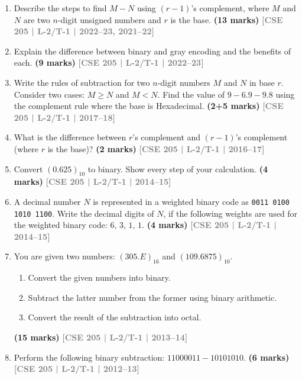 \documentclass[12pt]{article}
\newcommand{\yr}[1]{\hfill\textcolor{gray}{\small\textbf{[#1]}}}
\newcommand{\mk}[1]{\textcolor{orange!70!black}{\small\textbf{(#1 marks)}}}
\begin{document}
\begin{enumerate}

\item Describe the steps to find $M - N$ using $(r-1)$'s complement, where $M$ and $N$ are two $n$-digit unsigned numbers and $r$ is the base.
\mk{13} \yr{CSE 205 | L-2/T-1 | 2022--23, 2021--22}



\item Explain the difference between binary and gray encoding and the benefits of each.
\mk{9} \yr{CSE 205 | L-2/T-1 | 2022--23}



\item Write the rules of subtraction for two $n$-digit numbers $M$ and $N$ in base $r$. Consider two cases: $M \geq N$ and $M < N$. Find the value of $9 - 6.9 - 9.8$ using the complement rule where the base is Hexadecimal.
\mk{2+5} \yr{CSE 205 | L-2/T-1 | 2017--18}



\item What is the difference between $r$'s complement and $(r-1)$'s complement (where $r$ is the base)? 
\mk{2} \yr{CSE 205 | L-2/T-1 | 2016--17}



\item Convert $(0.625)_{10}$ to binary. Show every step of your calculation.
\mk{4} \yr{CSE 205 | L-2/T-1 | 2014--15}



\item A decimal number $N$ is represented in a weighted binary code as \texttt{0011 0100 1010 1100}. Write the decimal digits of $N$, if the following weights are used for the weighted binary code: $6,\,3,\,1,\,1$.
\mk{4} \yr{CSE 205 | L-2/T-1 | 2014--15}



\item You are given two numbers: $(305.E)_{16}$ and $(109.6875)_{10}$.
\begin{enumerate}
  \item Convert the given numbers into binary.
  \item Subtract the latter number from the former using binary arithmetic.
  \item Convert the result of the subtraction into octal.
\end{enumerate}
\mk{15} \yr{CSE 205 | L-2/T-1 | 2013--14}



\item Perform the following binary subtraction: $11000011 - 10101010$.
\mk{6} \yr{CSE 205 | L-2/T-1 | 2012--13}




\end{enumerate}
\end{document}
